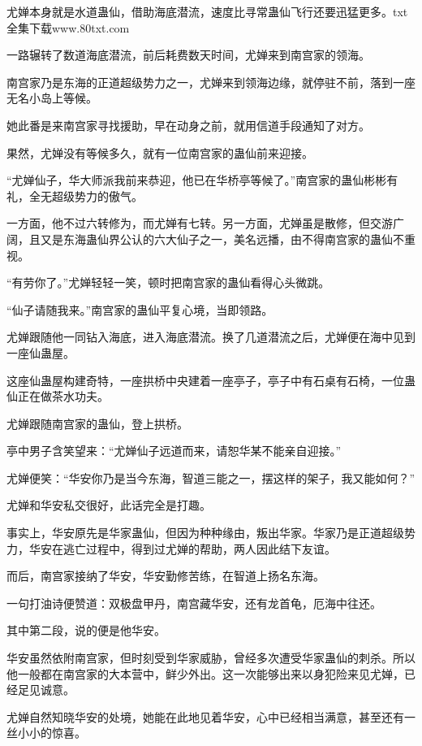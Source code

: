 
\begin{this_body}

尤婵本身就是水道蛊仙，借助海底潜流，速度比寻常蛊仙飞行还要迅猛更多。txt全集下载www.80txt.com

一路辗转了数道海底潜流，前后耗费数天时间，尤婵来到南宫家的领海。

南宫家乃是东海的正道超级势力之一，尤婵来到领海边缘，就停驻不前，落到一座无名小岛上等候。

她此番是来南宫家寻找援助，早在动身之前，就用信道手段通知了对方。

果然，尤婵没有等候多久，就有一位南宫家的蛊仙前来迎接。

“尤婵仙子，华大师派我前来恭迎，他已在华桥亭等候了。”南宫家的蛊仙彬彬有礼，全无超级势力的傲气。

一方面，他不过六转修为，而尤婵有七转。另一方面，尤婵虽是散修，但交游广阔，且又是东海蛊仙界公认的六大仙子之一，美名远播，由不得南宫家的蛊仙不重视。

“有劳你了。”尤婵轻轻一笑，顿时把南宫家的蛊仙看得心头微跳。

“仙子请随我来。”南宫家的蛊仙平复心境，当即领路。

尤婵跟随他一同钻入海底，进入海底潜流。换了几道潜流之后，尤婵便在海中见到一座仙蛊屋。

这座仙蛊屋构建奇特，一座拱桥中央建着一座亭子，亭子中有石桌有石椅，一位蛊仙正在做茶水功夫。

尤婵跟随南宫家的蛊仙，登上拱桥。

亭中男子含笑望来：“尤婵仙子远道而来，请恕华某不能亲自迎接。”

尤婵便笑：“华安你乃是当今东海，智道三能之一，摆这样的架子，我又能如何？”

尤婵和华安私交很好，此话完全是打趣。

事实上，华安原先是华家蛊仙，但因为种种缘由，叛出华家。华家乃是正道超级势力，华安在逃亡过程中，得到过尤婵的帮助，两人因此结下友谊。

而后，南宫家接纳了华安，华安勤修苦练，在智道上扬名东海。

一句打油诗便赞道：双极盘甲丹，南宫藏华安，还有龙首龟，厄海中往还。

其中第二段，说的便是他华安。

华安虽然依附南宫家，但时刻受到华家威胁，曾经多次遭受华家蛊仙的刺杀。所以他一般都在南宫家的大本营中，鲜少外出。这一次能够出来以身犯险来见尤婵，已经足见诚意。

尤婵自然知晓华安的处境，她能在此地见着华安，心中已经相当满意，甚至还有一丝小小的惊喜。


\end{this_body}
